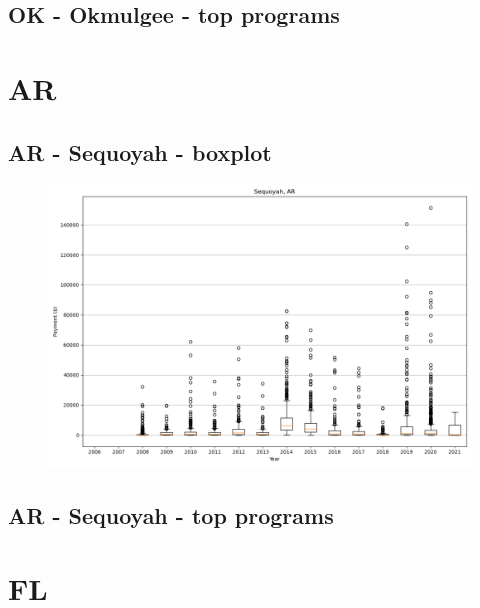 \subsection*{OK - Okmulgee - top programs}

\newpage
\section*{AR}
\subsection*{AR - Sequoyah - boxplot}
\begin{figure}[h]
\centering
\includegraphics[width=7in]{../output/boxplots/counties/Sequoyah-AR_boxplot.png}
\end{figure}


\subsection*{AR - Sequoyah - top programs}

\newpage
\section*{FL}
